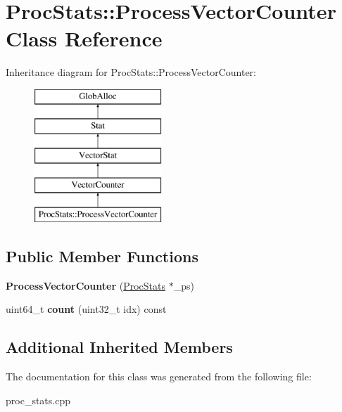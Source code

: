\hypertarget{classProcStats_1_1ProcessVectorCounter}{\section{Proc\-Stats\-:\-:Process\-Vector\-Counter Class Reference}
\label{classProcStats_1_1ProcessVectorCounter}
}
Inheritance diagram for Proc\-Stats\-:\-:Process\-Vector\-Counter\-:\begin{figure}[H]
\begin{center}
\leavevmode
\includegraphics[height=5.000000cm]{classProcStats_1_1ProcessVectorCounter}
\end{center}
\end{figure}
\subsection*{Public Member Functions}
\begin{DoxyCompactItemize}
\item 
\hypertarget{classProcStats_1_1ProcessVectorCounter_aaa84227ea2ba5b9797c6fd18c3277914}{{\bfseries Process\-Vector\-Counter} (\hyperlink{classProcStats}{Proc\-Stats} $\ast$\-\_\-ps)}\label{classProcStats_1_1ProcessVectorCounter_aaa84227ea2ba5b9797c6fd18c3277914}

\item 
\hypertarget{classProcStats_1_1ProcessVectorCounter_a5b1c76bcf6b6429fec1a4bbf20fdfdf4}{uint64\-\_\-t {\bfseries count} (uint32\-\_\-t idx) const }\label{classProcStats_1_1ProcessVectorCounter_a5b1c76bcf6b6429fec1a4bbf20fdfdf4}

\end{DoxyCompactItemize}
\subsection*{Additional Inherited Members}


The documentation for this class was generated from the following file\-:\begin{DoxyCompactItemize}
\item 
proc\-\_\-stats.\-cpp\end{DoxyCompactItemize}
